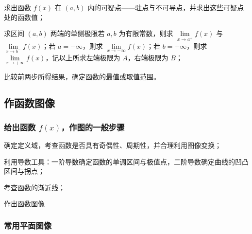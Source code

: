 \documentclass[../book.tex]{subfiles}
\begin{document}
    \begin{circlenum}
        \item 求出函数 $f(x)$ 在 $(a,b)$ 内的可疑点——驻点与不可导点，并求出这些可疑点处的函数值；
        \item 求区间 $(a,b)$ 两端的单侧极限若 $a,b$ 为有限常数，则求 $\lim\limits_{x\to a^+} f(x)$ 与 $\lim\limits_{x\to b^-} f(x)$；若 $a=-\infty$，则求 $\lim\limits_{x\to -\infty} f(x)$；若 $b=+\infty$，则求 $\lim\limits_{x\to +\infty} f(x)$，记以上所求左端极限为 $A$，右端极限为 $B$；
        \item 比较前两步所得结果，确定函数的最值或取值范围。
    \end{circlenum}

    \subsection{作函数图像}

    \subsubsection{给出函数 $f(x)$，作图的一般步骤}

    \begin{circlenum}
        \item 确定定义域，考查函数是否具有奇偶性、周期性，并合理利用图像变换；
        \item 利用导数工具：一阶导数确定函数的单调区间与极值点，二阶导数确定曲线的凹凸区间与拐点；
        \item 考查函数的渐近线；
        \item 作出函数图像
    \end{circlenum}

    \subsubsection{常用平面图像}
\end{document}
